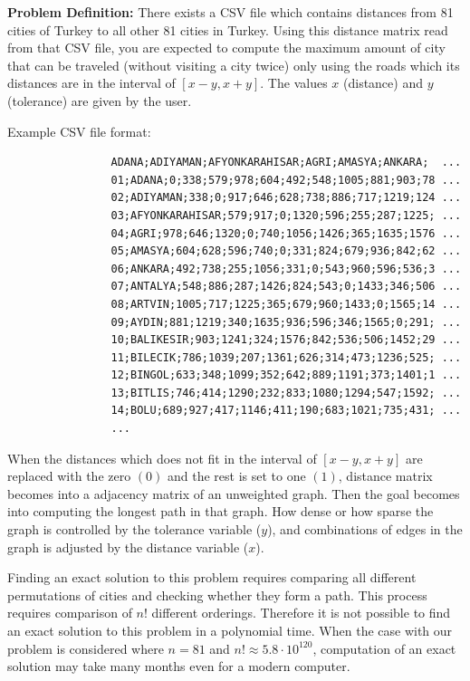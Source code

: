 \documentclass[12pt]{report}
\begin{document}
            \textbf{Problem Definition:} There exists a CSV file which contains distances from 81 cities of Turkey to all other 81 cities in Turkey. 
            Using this distance matrix read from that CSV file, you are expected to compute the maximum amount of city that can be traveled 
            (without visiting a city twice) only using the roads which its distances are in the interval of $[x-y, x+y]$. The values $x$ (distance) and $y$ (tolerance) 
            are given by the user.
            \newline

            Example CSV file format:

            \begin{verbatim}
                ADANA;ADIYAMAN;AFYONKARAHISAR;AGRI;AMASYA;ANKARA;  ...
                01;ADANA;0;338;579;978;604;492;548;1005;881;903;78 ...
                02;ADIYAMAN;338;0;917;646;628;738;886;717;1219;124 ...
                03;AFYONKARAHISAR;579;917;0;1320;596;255;287;1225; ...
                04;AGRI;978;646;1320;0;740;1056;1426;365;1635;1576 ...
                05;AMASYA;604;628;596;740;0;331;824;679;936;842;62 ...
                06;ANKARA;492;738;255;1056;331;0;543;960;596;536;3 ...
                07;ANTALYA;548;886;287;1426;824;543;0;1433;346;506 ...
                08;ARTVIN;1005;717;1225;365;679;960;1433;0;1565;14 ...
                09;AYDIN;881;1219;340;1635;936;596;346;1565;0;291; ...
                10;BALIKESIR;903;1241;324;1576;842;536;506;1452;29 ...
                11;BILECIK;786;1039;207;1361;626;314;473;1236;525; ...
                12;BINGOL;633;348;1099;352;642;889;1191;373;1401;1 ...
                13;BITLIS;746;414;1290;232;833;1080;1294;547;1592; ...
                14;BOLU;689;927;417;1146;411;190;683;1021;735;431; ...
                ...
            \end{verbatim}

            When the distances which does not fit in the interval of $[x-y, x+y]$ are replaced with the zero $(0)$ and the rest is set to one $(1)$, distance matrix becomes into a 
            adjacency matrix of an unweighted graph. Then the goal becomes into computing the longest path in that graph. How dense or how sparse the graph is controlled by the 
            tolerance variable ($y$), and combinations of edges in the graph is adjusted by the distance variable ($x$).
            
            Finding an exact solution to this problem requires comparing all different 
            permutations of cities and checking whether they form a path. This process requires comparison of $n!$ different orderings. Therefore it is not possible
            to find an exact solution to this problem in a polynomial time. When the case with our problem is considered where $n=81$ and $n! \approx 5.8\cdot 10^{120}$,
            computation of an exact solution may take many months even for a modern computer.
\end{document}
